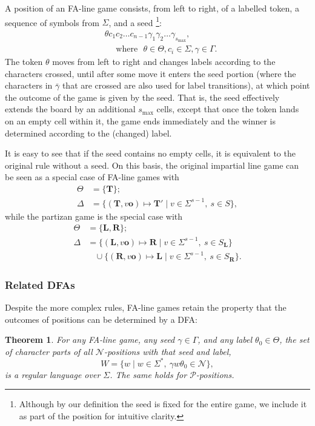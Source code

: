 \documentclass[11pt]{article}
\newtheorem{theorem}{Theorem}[section]
\theoremstyle{definition}
\theoremstyle{plain}
\newcommand{\varP}{\mathcal{P}}
\newcommand{\varN}{\mathcal{N}}
\newcommand{\rmL}{\mathbf{L}}
\newcommand{\rmR}{\mathbf{R}}
\newcommand{\e}{\mathbf{o}}
\newcommand{\m}{\mathbf{T}}
\begin{document}
A position of an FA-line game consists, from left to right, of a labelled token, a sequence of symbols from $\varSigma$, and a seed
\footnote{Although by our definition the seed is fixed for the entire game, we include it as part of the position for intuitive clarity.}:
\begin{align*}
    & \theta c_1 c_2 \ldots c_{n-1} \gamma_1 \gamma_2\ldots\gamma_{s_{\max}}, \\
    & \text{~~~~where~~}\theta \in\varTheta, c_i\in\varSigma, \gamma\in\varGamma.
\end{align*}
The token $\theta$ moves from left to right and changes labels according to the characters crossed, until after some move it enters the seed portion (where the characters in $\bar{\gamma}$ that are crossed are also used for label transitions), at which point the outcome of the game is given by the seed.
That is, the seed effectively extends the board by an additional $s_{\max}$ cells, except that once the token lands on an empty cell within it, the game ends immediately and the winner is determined according to the (changed) label.

It is easy to see that if the seed contains no empty cells, it is equivalent to the original rule without a seed.
On this basis, the original impartial line game can be seen as a special case of FA-line games with
\begin{align*}
    \varTheta &= \{\m\}; \\
    \varDelta &= \{(\m, v\e)\mapsto \m' \mid v\in\varSigma^{s-1},\ s\in S \},
\end{align*}
while the partizan game is the special case with
\begin{align*}
    \varTheta &= \{\rmL, \rmR\}; \\
    \varDelta &= \{(\rmL, v\e)\mapsto \rmR \mid v\in\varSigma^{s-1},\ s\in S_{\rmL} \} \\
              &~~~~ \cup \{(\rmR, v\e)\mapsto \rmL \mid v\in\varSigma^{s-1},\ s\in S_{\rmR} \}.
\end{align*}

\subsubsection{Related DFAs}

Despite the more complex rules, FA-line games retain the property that the outcomes of positions can be determined by a DFA:

\begin{theorem}\label{line_dfa}
    For any FA-line game, any seed $\gamma\in\varGamma$, and any label $\theta_0 \in\varTheta$, the set of character parts of all $\varN$-positions with that seed and label,
    \[
        W = \{w \mid w\in\varSigma^*,\ \gamma w\theta_0 \in \varN\},
    \]
    is a regular language over $\varSigma$. The same holds for $\varP$-positions.
\end{theorem}
\end{document}
